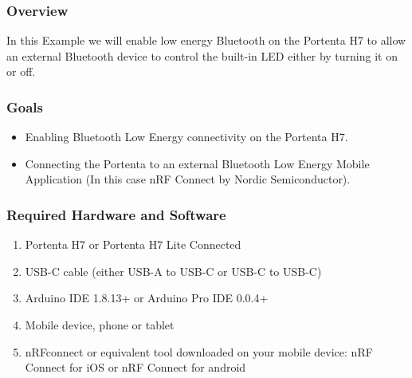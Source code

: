 \subsubsection{Overview}
In this Example we will enable low energy Bluetooth  on the Portenta H7 to allow an external Bluetooth device to control the built-in LED either by turning it on or off. \cite{bluetoothPortentaH7:2024}

\subsubsection{Goals}
\begin{itemize}
	\item Enabling Bluetooth Low Energy connectivity on the Portenta H7.
	\item Connecting the Portenta to an external Bluetooth Low Energy Mobile Application (In this case nRF Connect by Nordic Semiconductor). \cite{bluetoothPortentaH7:2024}
\end{itemize}

\subsubsection {Required Hardware and Software}
\begin{enumerate}
	\item Portenta H7 or Portenta H7 Lite Connected 
	\item USB-C cable (either USB-A to USB-C or USB-C to USB-C)
	\item Arduino IDE 1.8.13+ or Arduino Pro IDE 0.0.4+
	\item Mobile device, phone or tablet
	\item nRFconnect or equivalent tool downloaded on your mobile device: nRF Connect for iOS or nRF Connect for android \cite{bluetoothPortentaH7:2024}
\end{enumerate}

